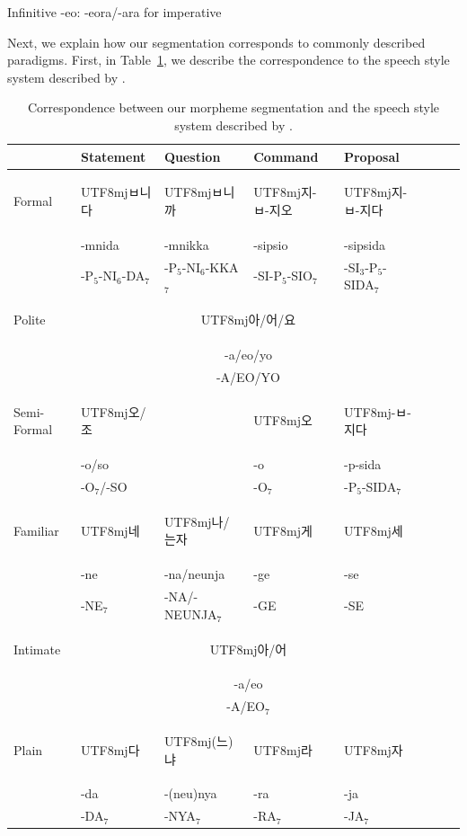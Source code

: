 \documentclass[11pt,letterpaper]{article}
\newcommand{\korean}[1]{\begin{CJK}{UTF8}{mj}#1\end{CJK}}
\begin{document}
Infinitive -eo: -eora/-ara for imperative \citep[4.3.6.4]{yeon2010korean}


Next, we explain how our segmentation corresponds to commonly described paradigms.
First, in Table~\ref{tab:korean-styles}, we describe the correspondence to the speech style system described by \citep[4.3.2]{yeon2010korean}.



\begin{table}
\begin{tabular}{l||l|l|l|llll}
            & Statement & Question  & Command    & Proposal    \\ \hline\hline
Formal      &  \korean{ㅂ니다} & \korean{ㅂ니까} & \korean{지-ㅂ-지오} & \korean{지-ㅂ-지다} \\ 
      &  -mnida & -mnikka  & -sipsio & -sipsida  \\ 
      &  -P$_5$-NI$_6$-DA$_7$ & -P$_5$-NI$_6$-KKA$_7$  & -SI-P$_5$-SIO$_7$ & -SI$_3$-P$_5$-SIDA$_7$ \\ \hline
Polite      &  \multicolumn{4}{c}{\korean{아/어/요}}  \\
      &  \multicolumn{4}{c}{-a/eo/yo}  \\
            & \multicolumn{4}{c}{-A/EO/YO} \\ \hline
Semi-Formal & \korean{오/조}   &           &   \korean{오}       &  \korean{-ㅂ-지다} \\
&  -o/so   &           & -o        & -p-sida \\
 &  -O$_7$/-SO   &           & -O$_7$    & -P$_5$-SIDA$_7$ \\\hline
Familiar    &    \korean{네}    &  \korean{나/는자} &  \korean{게}      &    \korean{세} \\
            & -ne                  & -na/neunja & -ge & -se \\ 
            & -NE$_7$                  & -NA/-NEUNJA$_7$ & -GE & -SE \\ \hline
Intimate      &  \multicolumn{4}{c}{\korean{아/어}}  \\
      &  \multicolumn{4}{c}{-a/eo}  \\
            & \multicolumn{4}{c}{-A/EO$_7$} \\ \hline
Plain       &   \korean{다}     &  \korean{(느)냐} &  \korean{라}     &  \korean{자}\\
            &  -da    &  -(neu)nya & -ra      & -ja \\
            & -DA$_7$    &   -NYA$_7$          & -RA$_7$      & -JA$_7$\\
\end{tabular}
\caption{Correspondence between our morpheme segmentation and the speech style system described by \citep[4.3.2]{yeon2010korean}.}\label{tab:korean-styles}
\end{table}
\end{document}
